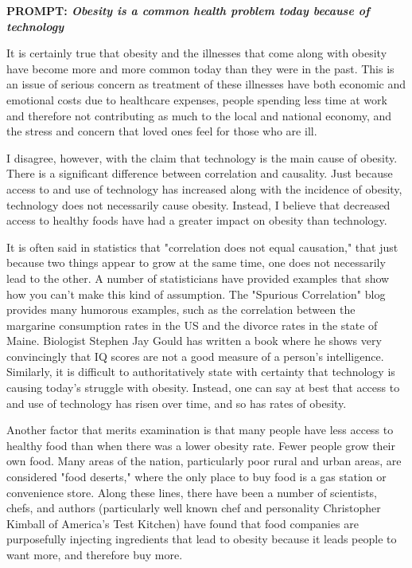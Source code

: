 \documentclass[12pt]{article}
\begin{document}
\noindent\large\textbf{PROMPT: \textit{Obesity is a common health problem today because of\\technology}}\normalsize

It is certainly true that obesity and the illnesses that come along with obesity have become more and more common today than they were in the past. This is an issue of serious concern as treatment of these illnesses have both economic and emotional costs due to healthcare expenses, people spending less time at work and therefore not contributing as much to the local and national economy, and the stress and concern that loved ones feel for those who are ill.

I disagree, however, with the claim that technology is the main cause of obesity. There is a significant difference between correlation and causality. Just because access to and use of technology has increased along with the incidence of obesity, technology does not necessarily cause obesity. Instead, I believe that decreased access to healthy foods have had a greater impact on obesity than technology.

It is often said in statistics that "correlation does not equal causation," that just because two things appear to grow at the same time, one does not necessarily lead to the other. A number of statisticians have provided examples that show how you can't make this kind of assumption. The "Spurious Correlation" blog provides many humorous examples, such as the correlation between the margarine consumption rates in the US and the divorce rates in the state of Maine. Biologist Stephen Jay Gould has written a book where he shows very convincingly that IQ scores are not a good measure of a person's intelligence. Similarly, it is difficult to authoritatively state with certainty that technology is causing today's struggle with obesity. Instead, one can say at best that access to and use of technology has risen over time, and so has rates of obesity.

Another factor that merits examination is that many people have less access to healthy food than when there was a lower obesity rate. Fewer people grow their own food. Many areas of the nation, particularly poor rural and urban areas, are considered "food deserts," where the only place to buy food is a gas station or convenience store. Along these lines, there have been a number of scientists, chefs, and authors (particularly well known chef and personality Christopher Kimball of America's Test Kitchen) have found that food companies are purposefully injecting ingredients that lead to obesity because it leads people to want more, and therefore buy more.
\end{document}
